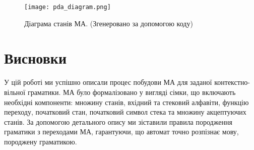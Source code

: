 \documentclass[12pt,a4paper]{article}
\begin{document}
\begin{figure}[h!]
  \centering
  \texttt{[image: pda\_diagram.png]}
  \caption{Діаграма станів МА. (Згенеровано за допомогою коду)}
  \label{fig:pda_diagram}
\end{figure}

\newpage

\section*{Висновки}

У цій роботі ми успішно описали процес побудови МА для заданої контекстно-вільної граматики. МА було формалізовано у вигляді сімки, що включають необхідні компоненти: множину станів, вхідний та стековий алфавіти, функцію переходу, початковий стан, початковий символ стека та множину акцептуючих станів. За допомогою детального опису ми зіставили правила породження граматики з переходами МА, гарантуючи, що автомат точно розпізнає мову, породжену граматикою.
\end{document}
